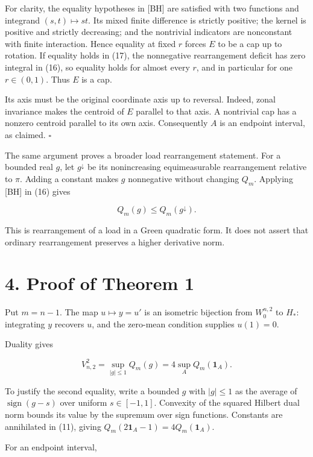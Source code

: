 \documentclass[11pt]{article}
\begin{document}
For clarity, the equality hypotheses in {[}BH{]} are satisfied with two
functions and integrand \((s,t)\mapsto st\). Its mixed finite difference
is strictly positive; the kernel is positive and strictly decreasing;
and the nontrivial indicators are nonconstant with finite interaction.
Hence equality at fixed \(r\) forces \(E\) to be a cap up to rotation.
If equality holds in (17), the nonnegative rearrangement deficit has
zero integral in (16), so equality holds for almost every \(r\), and in
particular for one \(r\in(0,1)\). Thus \(E\) is a cap.

Its axis must be the original coordinate axis up to reversal. Indeed,
zonal invariance makes the centroid of \(E\) parallel to that axis. A
nontrivial cap has a nonzero centroid parallel to its own axis.
Consequently \(A\) is an endpoint interval, as claimed. \(\square\)

The same argument proves a broader load rearrangement statement. For a
bounded real \(g\), let \(g^\downarrow\) be its nonincreasing
equimeasurable rearrangement relative to \(\pi\). Adding a constant
makes \(g\) nonnegative without changing \(Q_m\). Applying {[}BH{]} in
(16) gives

\[
Q_m(g)\le Q_m(g^\downarrow).
\tag{18}
\]

This is rearrangement of a load in a Green quadratic form. It does not
assert that ordinary rearrangement preserves a higher derivative norm.

\section{4. Proof of Theorem 1}\label{proof-of-theorem-1}

Put \(m=n-1\). The map \(u\mapsto y=u'\) is an isometric bijection from
\(W_0^{n,2}\) to \(H_*\): integrating \(y\) recovers \(u\), and the
zero-mean condition supplies \(u(1)=0\).

Duality gives

\[
V_{n,2}^2=\sup_{|g|\le1}Q_m(g)
=4\sup_A Q_m(\mathbf1_A).
\tag{19}
\]

To justify the second equality, write a bounded \(g\) with \(|g|\le1\)
as the average of \(\operatorname{sign}(g-s)\) over uniform
\(s\in[-1,1]\). Convexity of the squared Hilbert dual norm bounds its
value by the supremum over sign functions. Constants are annihilated in
(11), giving \(Q_m(2\mathbf1_A-1)=4Q_m(\mathbf1_A)\).

For an endpoint interval,
\end{document}

